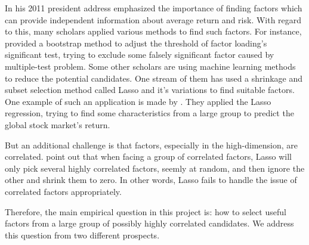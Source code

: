 In his 2011 president address \citeauthor{Cochrane2011} emphasized the importance of finding factors which can provide independent information about average return and risk.
With regard to this, many scholars applied various methods to find such factors. 
For instance,  provided a bootstrap method to adjust the threshold of factor loading's significant test, trying to exclude some falsely significant factor caused by multiple-test problem.
Some other scholars are using machine learning methods to reduce the potential candidates. 
One stream of them has used a shrinkage and subset selection method called Lasso \cite{Tibshirani1996} and it's variations to find suitable factors.
One example of such an application is made by .
They applied the Lasso regression, trying to find some characteristics from a large group to predict the global stock market's return.

But an additional challenge is that factors, especially in the high-dimension, are correlated.
 point out that when facing a group of correlated factors, Lasso will only pick several highly correlated factors, seemly at random, and then ignore the other and shrink them to zero. 
In other words, Lasso fails to handle the issue of correlated factors appropriately.





Therefore, the main empirical question in this project is: how to select useful factors from a large group of possibly highly correlated candidates.
We address this question from two different prospects.

